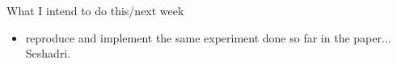 \documentclass[10pt]{article}
\begin{document}
\begin{weeklybox}{What I intend to do this/next week}

  \small

  \begin{itemize}

    \item reproduce and implement the same experiment done so far in the paper... Seshadri.
  \end{itemize}

\end{weeklybox}

\vfill

\vfill
\end{document}
